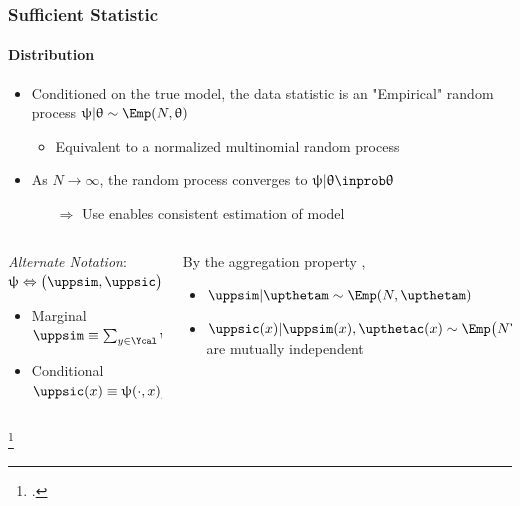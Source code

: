 \documentclass[aspectratio=169]{beamer}
\begin{document}
\begin{frame}
\frametitle{Sufficient Statistic}
\framesubtitle{Distribution}

\begin{itemize}
\item Conditioned on the true model, the data statistic is an "Empirical" random process $\uppsi | \uptheta \sim \Emp(N,\uptheta)$
\begin{itemize}
\item Equivalent to a normalized multinomial random process 
\end{itemize}
\item As $N \to \infty$, the random process converges to $\uppsi | \uptheta \inprob \uptheta$
\begin{itemize}
\item [$\Rightarrow$] Use enables \alert{consistent} estimation of model
\end{itemize}

\end{itemize}



\hrulefill

\begin{columns}[c]

\begin{column}{.5\linewidth}
\textit{Alternate Notation}: $\uppsi \Leftrightarrow \big( \uppsim,\uppsic \big)$
\begin{itemize}
\item Marginal $\uppsim \equiv \sum_{y \in \Ycal} \uppsi(y,\cdot)$
\item Conditional $\uppsic(x) \equiv \uppsi(\cdot,x) / \uppsim(x)$
\end{itemize}
\end{column}

\begin{column}{.5\linewidth}
By the aggregation property \footnotemark,
\begin{itemize}
\item $\uppsim | \upthetam \sim \Emp(N,\upthetam)$
\item $\uppsic(x) | \uppsim(x),\upthetac(x) \sim \Emp\big( N \uppsim(x),\upthetac(x) \big)$ are mutually independent
\end{itemize}
\end{column}

\end{columns}

\footcitetext{johnson}

\end{frame}
\end{document}
